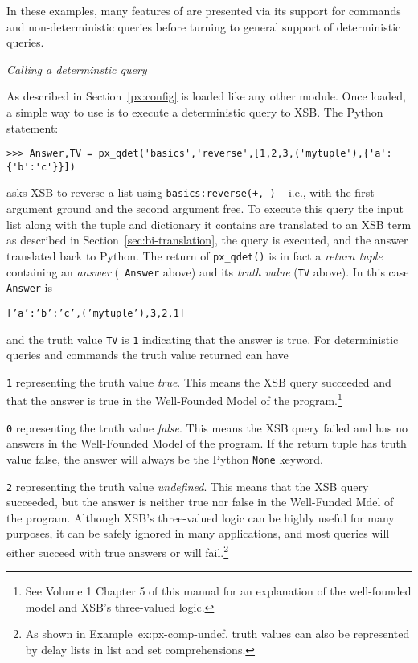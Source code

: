 In these examples, many features of \px{} are presented via its
support for commands and non-deterministic queries before turning to
general support of deterministic queries.

\begin{example} \rm
{\em Calling a determinstic query}
  
  As described in Section~\ref{px:config} \px{} is loaded like any
  other module.  Once loaded, a simple way to use \px{} is to
  execute a deterministic query to XSB.  The Python statement:

\begin{verbatim}  
>>> Answer,TV = px_qdet('basics','reverse',[1,2,3,('mytuple'),{'a':{'b':'c'}}])
\end{verbatim}

\noindent
  asks XSB to reverse a list using {\tt basics:reverse(+,-)} -- i.e.,
  with the first argument ground and the second argument free.  To
  execute this query the input list along with the tuple and
  dictionary it contains are translated to an XSB term as described in
  Section~\ref{sec:bi-translation}, the query is executed, and the
  answer translated back to Python.  The return of {\tt px\_qdet()} is
  in fact a {\em return tuple} containing an {\em answer} ({\tt
    Answer} above) and its {\em truth value} ({\tt TV} above).  In this
    case {\tt Answer} is

  {\tt [{'a':{'b':'c'}},('mytuple'),3,2,1]}

\noindent    
and the truth value {\tt TV} is {\tt 1} indicating that the answer is
true.  For deterministic queries and commands the truth value returned
can have

\bi
\item {\tt 1} representing the truth value {\em true}.  This means the
  XSB query succeeded and that the answer is true in the Well-Founded
  Model of the program.\footnote{See Volume 1 Chapter 5 of this manual
    for an explanation of the well-founded model and XSB's
    three-valued logic.}
\item {\tt 0} representing the truth value {\em false}.  This means
  the XSB query failed and has no answers in the Well-Founded Model of
  the program.  If the return tuple has truth value false, the answer
  will always be the Python {\tt None} keyword.
\item {\tt 2} representing the truth value {\em undefined}. This means
  that the XSB query succeeded, but the answer is neither true nor
  false in the Well-Funded Mdel of the program.  \ei
\noindent
Although XSB's three-valued logic can be highly useful for many
purposes, it can be safely ignored in many applications, and most
queries will either succeed with true answers or will
fail.\footnote{As shown in Example~{ex:px-comp-undef}, truth values
  can also be represented by delay lists in list and set
  comprehensions.}


\end{example}
